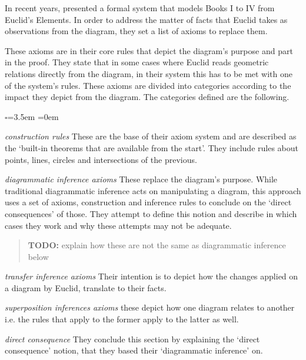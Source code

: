 \documentclass[]{interact}
\theoremstyle{plain}
\theoremstyle{definition}
\theoremstyle{remark}
\newcommand{\quotes}[1]{`#1'}
\newcommand{\comment}[2]
{
\begin{quote}
\textbf{#1:}
     #2
\end{quote}
}
\begin{document}
In recent years, \citet{avigad-etal:2009} presented a formal system that models
Books I to IV from Euclid's Elements. In order to address the matter
of facts that Euclid takes as observations from the diagram, they set
a list of axioms to replace them.

These axioms are in their core rules that depict
the diagram's purpose and part in the proof. They state that in some
cases where Euclid reads geometric relations directly from the
diagram, in their system this has to be met with one of the system's
rules. These axioms are divided into categories according to the
impact they depict from the diagram. The categories defined are the following.


\begin{list}{$\square$}{\leftmargin=3.5em \itemindent=0em}
	\item[\textit{construction rules}] These are the base of their axiom
	system and are described as the	\quotes{built-in theorems that are
	available from the start}. They include rules about
	points, lines, circles and intersections of the previous.

	\item[\textit{diagrammatic inference axioms}] These replace the diagram's
	purpose.
	 While traditional diagrammatic inference acts on manipulating a diagram,
	 this approach uses a set of axioms, construction and inference rules to
	 conclude on the \quotes{direct consequences} of those. They attempt to
	 define this notion and describe in which cases they work and why these
	 attempts may not be adequate.
	 \comment{TODO}{explain how these are not the same as diagrammatic 
	 inference below}
 
	 \item[\textit{transfer inference axioms}] Their intention is to depict how
	 the changes applied on a diagram by Euclid, translate to their facts.

	 \item[\textit{superposition inferences axioms}] these depict how one
	 diagram relates to another i.e. the rules that apply to the former apply
	 to the latter as well.
	 
	  \item[\textit{direct consequence}] They conclude this section by 
	  explaining the \quotes{direct consequence} notion, that they based their 
	  \quotes{diagrammatic inference} on. 
\end{list}
\end{document}
